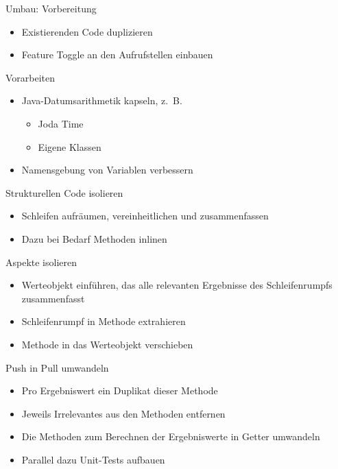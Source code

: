 \begin{frame}[fragile]{Umbau: Vorbereitung}
\begin{itemize}
\item Existierenden Code duplizieren
\item Feature Toggle an den Aufrufstellen einbauen
\end{itemize}
\end{frame}
 
\begin{frame}[fragile]{Vorarbeiten}
\begin{itemize}
\item Java-Datumsarithmetik kapseln, z.~B.
\begin{itemize}
\item Joda Time
\item Eigene Klassen
\end{itemize}
\end{itemize}

\begin{itemize}
\item Namensgebung von Variablen verbessern
\end{itemize}
\end{frame}

\begin{frame}[fragile]{Strukturellen Code isolieren}
\begin{itemize}
\item Schleifen aufräumen, vereinheitlichen und zusammenfassen
\item Dazu bei Bedarf Methoden inlinen
\end{itemize}
\end{frame}

\begin{frame}[fragile]{Aspekte isolieren}
\begin{itemize}
\item Werteobjekt einführen, das alle relevanten Ergebnisse des Schleifenrumpfs zusammenfasst
\item Schleifenrumpf in Methode extrahieren
\item Methode in das Werteobjekt verschieben
\end{itemize}
\end{frame}

\begin{frame}[fragile]{Push in Pull umwandeln}
\begin{itemize}
\item Pro Ergebniswert ein Duplikat dieser Methode
\item Jeweils Irrelevantes aus den Methoden entfernen
\item Die Methoden zum Berechnen der Ergebniswerte in Getter umwandeln
\item Parallel dazu Unit-Tests aufbauen
\end{itemize}
\end{frame}

